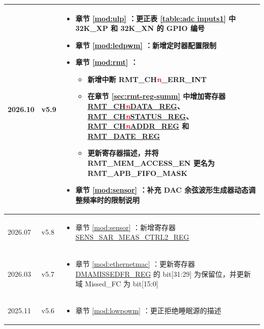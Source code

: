 \begin{longtable}[l]{ | m{2cm} | m{1.5cm} | m{12cm} | }
2026.10 & v5.9 &
\vspace{0.5em}
\begin{itemize}
    \item 章节 \ref{mod:ulp} \textit{\nameref{mod:ulp}}：更正表 \ref{table:adc inputs1} \textit{\nameref{table:adc inputs1}} 中 32K\_XP 和 32K\_XN 的 GPIO 编号 %
    \item 章节 \ref{mod:ledpwm} \textit{\nameref{mod:ledpwm}}：新增定时器配置限制 %
    \item 章节 \ref{mod:rmt} \textit{\nameref{mod:rmt}}：
        \begin{itemize}
            \item 新增中断 RMT\_CH\textcolor{red}{\it{n}}\_ERR\_INT
            \item 在章节 \ref{sec:rmt-reg-summ} \textit{\nameref{sec:rmt-reg-summ}} 中增加寄存器 \hyperref[regdesc:RMTCHnDATAREG]{RMT\_CH\textcolor{red}{\it{n}}DATA\_REG}、\hyperref[regdesc:RMTCHnSTATUSREG]{RMT\_CH\textcolor{red}{\it{n}}STATUS\_REG}、\hyperref[regdesc:RMTCHnADDRREG]{RMT\_CH\textcolor{red}{\it{n}}ADDR\_REG} 和 \hyperref[regdesc:RMTDATEREG]{RMT\_DATE\_REG}
            \item 更新寄存器描述，并将 RMT\_MEM\_ACCESS\_EN 更名为 RMT\_APB\_FIFO\_MASK
        \end{itemize}
    \item 章节 \ref{mod:sensor} \textit{\nameref{mod:sensor}}：补充 DAC 余弦波形生成器动态调整频率时的限制说明
\end{itemize}
\vspace{-1em}
\\\hline
2026.07 & v5.8 &
\vspace{0.5em}
\begin{itemize}
    \item 章节 \ref{mod:sensor} \textit{\nameref{mod:sensor}}：新增寄存器 \hyperref[regdesc:SENSSARMEASCTRL2REG]{SENS\_SAR\_MEAS\_CTRL2\_REG} %
\end{itemize}
\vspace{-1em}
\\\hline
2026.03 & v5.7 &
\vspace{0.5em}
\begin{itemize}
    \item 章节 \ref{mod:ethernetmac} \textit{\nameref{mod:ethernetmac}}：更新寄存器 \hyperref[regdesc:DMAMISSEDFRREG]{DMAMISSEDFR\_REG} 的 bit[31:29] 为保留位，并更新域 Missed\_FC 为 bit[15:0] %
\end{itemize}
\vspace{-1em}
\\\hline
2025.11 & v5.6 &
\vspace{0.5em}
\begin{itemize}
    \item 章节 \ref{mod:lowpowm} \textit{\nameref{mod:lowpowm}}：更正拒绝睡眠源的描述
\end{itemize}
\vspace{-1em}
\\\hline


\end{longtable}

